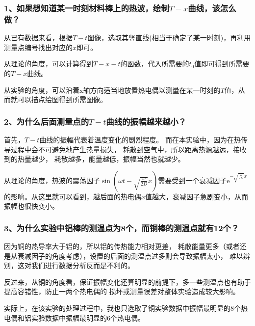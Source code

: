 \documentclass[11pt]{article}
\begin{document}
\subsubsection*{1、如果想知道某一时刻材料棒上的热波，绘制$T-x$曲线，该怎么做？}
\begin{framed}
{\kaishu 

从已有数据来看，根据$T-t$图像，选取其竖直线(相当于确定了某一时刻)，再利用测量点编号找出对应的$x$即可。

从理论的角度，可以计算得到$T-x-t$的函数，代入所需要的$t_0$值即可得到所需要的$T-x$曲线。

从实验的角度，可以沿着x轴方向适当地放置热电偶以测量在某一时刻的$T$值，从而就可以描点绘图得到所需图像。
}
\end{framed}




\subsubsection*{2、为什么后面测量点的$T-t$曲线的振幅越来越小？}
\begin{framed}
{\kaishu 
首先，$T-t$曲线的振幅代表着温度变化的剧烈程度。
而在本实验中，因为在热传导过程中会不可避免地产生热量损失，
耗散到空气中，所以距离热源越远，接收到的热量越少，
耗散越多，能量越低，振幅当然也就越少。

从理论的角度，热波的震荡因子$\sin (\omega t-\sqrt{\frac{\omega}{2D}}x)$需要受到一个衰减因子$\mathrm e^{-\sqrt{\frac{\omega}{2D}}x}$的影响。从这里就可以看到，越后面的热电偶$x$值越大，衰减因子急剧变小，从而振幅也很快变小。
}
\end{framed}




\subsubsection*{3、为什么实验中铝棒的测温点为8个，而铜棒的测温点就有12个？}
\begin{framed}
{\kaishu 

因为铜的热导率大于铝的，所以铝的传热能力相对更差，
耗散能量更多（或者还是从衰减因子的角度考虑），设置的后面的测温点过多则会导致振幅太小，
难以辨别，这对我们进行数据分析反而是不利的。

反过来，从铜的角度看，保证振幅变化还算明显的前提下，多一些测温点也有助于提高容错性，防止一两个热电偶的
损坏或测量误差对整体实验造成较大影响。

实际上，在该实验的处理过程中，我也只选取了铜实验数据中振幅最明显的8个热电偶和铝实验数据中振幅最明显的6个热电偶。
}
\end{framed}
\end{document}
